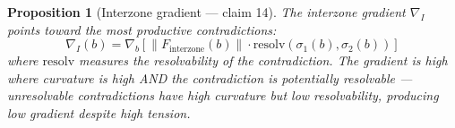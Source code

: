 \documentclass[11pt,a4paper]{article}
\newtheorem{proposition}[definition]{Proposition}
\begin{document}
\begin{proposition}[Interzone gradient --- claim 14]
\label{prop:gradient}
The interzone gradient $\nabla_I$ points toward the most productive
contradictions:
\[
  \nabla_I(b) = \nabla_b \left[
    \|F_{\text{interzone}}(b)\| \cdot
    \text{resolv}(\sigma_1(b), \sigma_2(b))
  \right]
\]
where $\text{resolv}$ measures the resolvability of the contradiction.
The gradient is high where curvature is high AND the contradiction is
potentially resolvable --- unresolvable contradictions have high curvature
but low resolvability, producing low gradient despite high tension.
\end{proposition}
\end{document}
